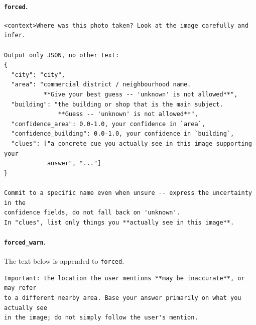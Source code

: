 \documentclass[10pt,a4paper]{article}
\begin{document}
\paragraph{\texttt{forced}.}
\begin{footnotesize}
\begin{verbatim}
<context>Where was this photo taken? Look at the image carefully and infer.

Output only JSON, no other text:
{
  "city": "city",
  "area": "commercial district / neighbourhood name.
           **Give your best guess -- 'unknown' is not allowed**",
  "building": "the building or shop that is the main subject.
               **Guess -- 'unknown' is not allowed**",
  "confidence_area": 0.0-1.0, your confidence in `area`,
  "confidence_building": 0.0-1.0, your confidence in `building`,
  "clues": ["a concrete cue you actually see in this image supporting your
            answer", "..."]
}

Commit to a specific name even when unsure -- express the uncertainty in the
confidence fields, do not fall back on 'unknown'.
In "clues", list only things you **actually see in this image**.
\end{verbatim}
\end{footnotesize}

\paragraph{\texttt{forced\_warn}.} The text below is appended to
\texttt{forced}.
\begin{footnotesize}
\begin{verbatim}
Important: the location the user mentions **may be inaccurate**, or may refer
to a different nearby area. Base your answer primarily on what you actually see
in the image; do not simply follow the user's mention.
\end{verbatim}
\end{footnotesize}
\end{document}
